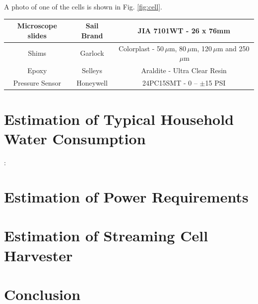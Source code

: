 \documentclass[10pt,final,journal]{IEEEtran}
\begin{document}
    A photo of one of the cells is shown in Fig. \ref{fig:cell}.


    \begin{tabular}{|c|c|c|} \hline
    Microscope slides & Sail Brand & JIA 7101WT - 26 x 76mm\tabularnewline \hline
    Shims & Garlock & Colorplast - 50$\,\mu$m, 80$\,\mu$m, 120$\,\mu$m and 250$\,\mu$m\tabularnewline \hline
    Epoxy & Selleys & Araldite - Ultra Clear Resin\tabularnewline \hline
    Pressure Sensor & Honeywell & 24PC15SMT - 0 -- $\pm$15 PSI\tabularnewline \hline
    \end{tabular}


    \section{Estimation of Typical Household Water Consumption}:
    \label{sect:waterConsumption}
    \section{Estimation of Power Requirements}
    \label{sect:powerRequirements}
    \section{Estimation of Streaming Cell Harvester}
    \label{sect:harvesterSize}
    \section{Conclusion}
    
    
\end{document}
